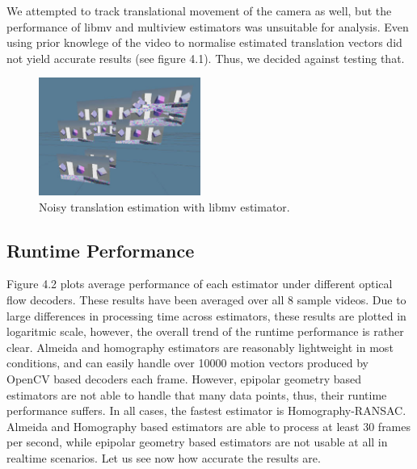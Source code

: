 \documentclass[11pt,english]{report}
\begin{document}
We attempted to track translational movement of the camera as well, but the performance of libmv and multiview estimators was unsuitable for analysis. Even using prior knowlege of the video to normalise estimated translation vectors did not yield accurate results (see figure 4.1). Thus, we decided against testing that.

\begin{figure}[!ht]
	\centering
	\includegraphics[width=150pt]{docs/report/translation.jpg}
	\caption{\centering Noisy translation estimation with libmv estimator.}
\end{figure}

\subsection{Runtime Performance}

Figure 4.2 plots average performance of each estimator under different optical flow decoders. These results have been averaged over all 8 sample videos. Due to large differences in processing time across estimators, these results are plotted in logaritmic scale, however, the overall trend of the runtime performance is rather clear. Almeida and homography estimators are reasonably lightweight in most conditions, and can easily handle over 10000 motion vectors produced by OpenCV based decoders each frame. However, epipolar geometry based estimators are not able to handle that many data points, thus, their runtime performance suffers. In all cases, the fastest estimator is Homography-RANSAC. Almeida and Homography based estimators are able to process at least 30 frames per second, while epipolar geometry based estimators are not usable at all in realtime scenarios. Let us see now how accurate the results are.
\end{document}
